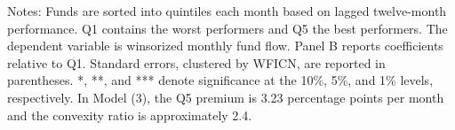 \documentclass{article}
\begin{document}
\begin{table}[htbp]
\begin{threeparttable}
\begin{tablenotes}
\footnotesize
\item Notes: Funds are sorted into quintiles each month based on lagged twelve-month performance. Q1 contains the worst performers and Q5 the best performers. The dependent variable is winsorized monthly fund flow. Panel B reports coefficients relative to Q1. Standard errors, clustered by WFICN, are reported in parentheses. *, **, and *** denote significance at the 10\%, 5\%, and 1\% levels, respectively. In Model (3), the Q5 premium is 3.23 percentage points per month and the convexity ratio is approximately 2.4.
\end{tablenotes}

\end{threeparttable}
\end{table}

\end{document}
